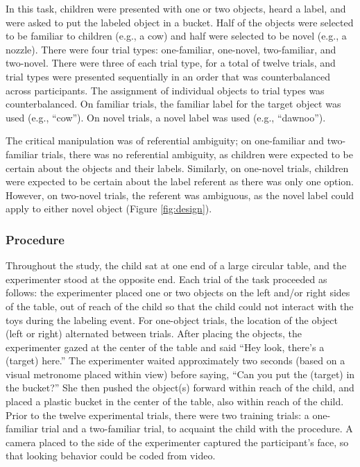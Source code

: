\documentclass[10pt, letterpaper]{article}
\begin{document}
In this task, children were presented with one or two objects, heard a
label, and were asked to put the labeled object in a bucket. Half of the
objects were selected to be familiar to children (e.g., a cow) and half
were selected to be novel (e.g., a nozzle). There were four trial types:
one-familiar, one-novel, two-familiar, and two-novel. There were three
of each trial type, for a total of twelve trials, and trial types were
presented sequentially in an order that was counterbalanced across
participants. The assignment of individual objects to trial types was
counterbalanced. On familiar trials, the familiar label for the target
object was used (e.g., ``cow''). On novel trials, a novel label was used
(e.g., ``dawnoo'').

The critical manipulation was of referential ambiguity; on one-familiar
and two-familiar trials, there was no referential ambiguity, as children
were expected to be certain about the objects and their labels.
Similarly, on one-novel trials, children were expected to be certain
about the label referent as there was only one option. However, on
two-novel trials, the referent was ambiguous, as the novel label could
apply to either novel object (Figure \ref{fig:design}).

\subsubsection{Procedure}\label{procedure}

Throughout the study, the child sat at one end of a large circular
table, and the experimenter stood at the opposite end. Each trial of the
task proceeded as follows: the experimenter placed one or two objects on
the left and/or right sides of the table, out of reach of the child so
that the child could not interact with the toys during the labeling
event. For one-object trials, the location of the object (left or right)
alternated between trials. After placing the objects, the experimenter
gazed at the center of the table and said ``Hey look, there's a (target)
here.'' The experimenter waited approximately two seconds (based on a
visual metronome placed within view) before saying, ``Can you put the
(target) in the bucket?'' She then pushed the object(s) forward within
reach of the child, and placed a plastic bucket in the center of the
table, also within reach of the child. Prior to the twelve experimental
trials, there were two training trials: a one-familiar trial and a
two-familiar trial, to acquaint the child with the procedure. A camera
placed to the side of the experimenter captured the participant's face,
so that looking behavior could be coded from video.
\end{document}
